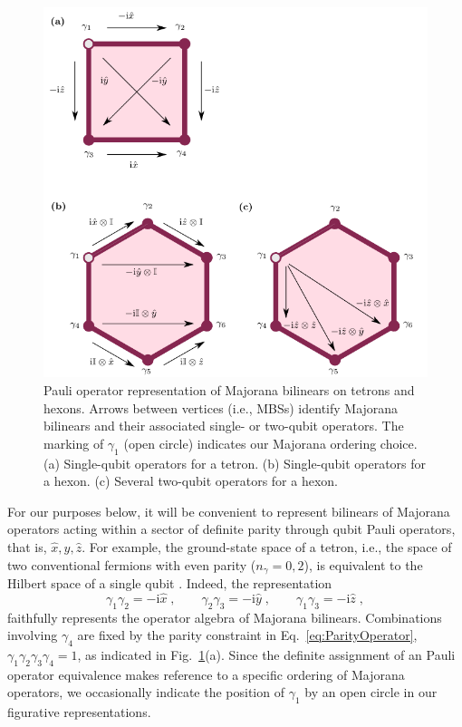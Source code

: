 \documentclass[twocolumn,floats,prx,showpacs]{revtex4-1}
\begin{document}
\begin{figure}[t]
\includegraphics[width=\columnwidth]{fig/MCB_legend.pdf}
\caption{Pauli operator representation of Majorana bilinears on tetrons and hexons.  Arrows between vertices (i.e., MBSs) identify Majorana bilinears and their associated single- or two-qubit operators. The marking of $\gamma_1$ (open circle) indicates our Majorana ordering choice. (a) Single-qubit operators for a tetron. (b) Single-qubit operators for a hexon. (c) Several two-qubit operators for a hexon. } 
\label{fig:MCB_legend}
\end{figure} 

For our purposes below, it will be convenient to represent bilinears of Majorana operators acting within a sector of definite parity through 
qubit Pauli operators, that is, $\hat x, \hat y, \hat z$. For example, the ground-state space of a tetron, i.e., the space of two conventional fermions with even parity ($n_\gamma=0,2$), is equivalent to the Hilbert space of a single qubit \cite{Beri2012}. Indeed, the representation
  \begin{equation}\label{eq:tetronqubit}
\gamma_1 \gamma_2=  -{\mathrm i}\hat x \;, \qquad \gamma_2 \gamma_3= -{\mathrm i} \hat y \;, \qquad  \gamma_1 \gamma_3= -{\mathrm i} \hat z \;,
 \end{equation} 
faithfully represents the operator algebra of Majorana bilinears. Combinations involving $\gamma_4$ are fixed by the parity constraint in Eq.~\eqref{eq:ParityOperator}, $\gamma_1\gamma_2\gamma_3\gamma_4=1$, as indicated in Fig.~\ref{fig:MCB_legend}(a). 
Since the definite assignment of an Pauli operator equivalence makes reference to a specific ordering of Majorana operators, we occasionally indicate the position of $\gamma_1$ by an open circle in our figurative representations. 
\end{document}
